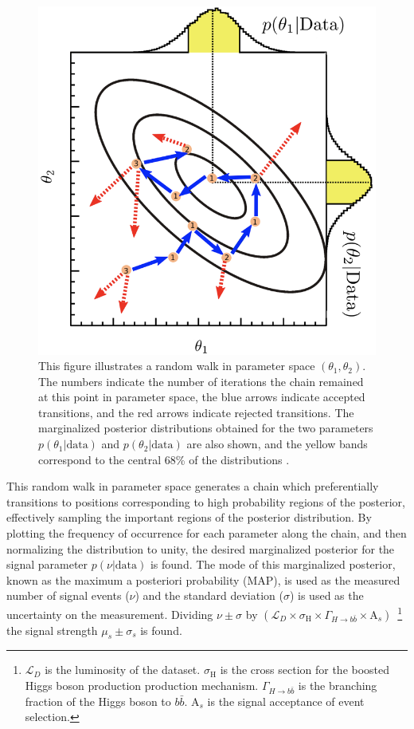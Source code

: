 \begin{figure}[!htbp]
\centering
\includegraphics[width=0.7\linewidth]{figures/fit/markov_chain}
\caption{This figure illustrates a random walk in parameter space $(\theta_{1},\theta_{2})$. The numbers indicate the number of iterations the chain remained at this point in parameter space, the blue arrows indicate accepted transitions, and the red arrows indicate rejected transitions. The marginalized posterior distributions obtained for the two parameters $p(\theta_{1}|\text{data})$ and $p(\theta_{2}|\text{data})$ are also shown, and the yellow bands correspond to the central 68\% of the distributions \cite{Beresford:2642397}.}
\label{sec:fit:markov_chain}
\end{figure}

This random walk in parameter space generates a chain which preferentially
transitions to positions corresponding to high probability regions of the
posterior, effectively sampling the important regions of the posterior
distribution.  By plotting the frequency of occurrence for each parameter along
the chain, and then normalizing the distribution to unity, the desired
marginalized posterior for the signal parameter $p(\nu|\text{data})$ is found.
The mode of this marginalized posterior, known as the maximum a posteriori
probability (MAP), is used as the measured number of signal events ($\nu$) and
the standard deviation ($\sigma$) is used as the uncertainty on the
measurement. Dividing $\nu \pm \sigma$ by $(\mathcal{L}_{D} \times
\sigma_\text{H} \times \Gamma_{H \rightarrow b\bar{b}} \times
\text{A}_{s})$~\footnote{$\mathcal{L}_{D}$ is the luminosity of the dataset.
$\sigma_\text{H}$ is the cross section for the boosted Higgs boson production
production mechanism.  $\Gamma_{H \rightarrow b\bar{b}}$ is the branching fraction of the
Higgs boson to $b\bar{b}$. $\text{A}_{s}$ is the signal acceptance of event selection.}
the signal strength $\mu_{s} \pm \sigma_{s}$ is found.
